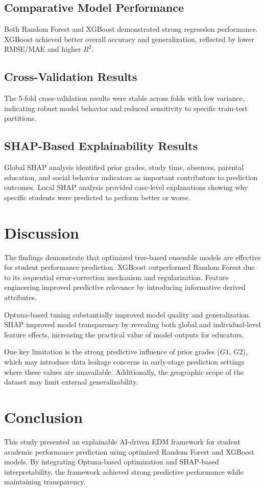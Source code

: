 \documentclass[12pt,a4paper]{article}
\begin{document}
\subsection{Comparative Model Performance}
Both Random Forest and XGBoost demonstrated strong regression performance. XGBoost achieved better overall accuracy and generalization, reflected by lower RMSE/MAE and higher $R^2$.

\subsection{Cross-Validation Results}
The 5-fold cross-validation results were stable across folds with low variance, indicating robust model behavior and reduced sensitivity to specific train-test partitions.

\subsection{SHAP-Based Explainability Results}
Global SHAP analysis identified prior grades, study time, absences, parental education, and social behavior indicators as important contributors to prediction outcomes. Local SHAP analysis provided case-level explanations showing why specific students were predicted to perform better or worse.

\section{Discussion}
The findings demonstrate that optimized tree-based ensemble models are effective for student performance prediction. XGBoost outperformed Random Forest due to its sequential error-correction mechanism and regularization. Feature engineering improved predictive relevance by introducing informative derived attributes.

Optuna-based tuning substantially improved model quality and generalization. SHAP improved model transparency by revealing both global and individual-level feature effects, increasing the practical value of model outputs for educators.

One key limitation is the strong predictive influence of prior grades ($G1$, $G2$), which may introduce data leakage concerns in early-stage prediction settings where these values are unavailable. Additionally, the geographic scope of the dataset may limit external generalizability.

\section{Conclusion}
This study presented an explainable AI-driven EDM framework for student academic performance prediction using optimized Random Forest and XGBoost models. By integrating Optuna-based optimization and SHAP-based interpretability, the framework achieved strong predictive performance while maintaining transparency.
\end{document}
